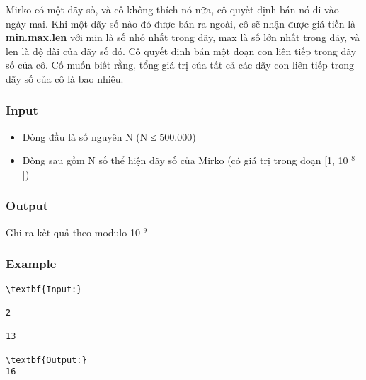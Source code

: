 



   Mirko có một dãy số, và cô không thích nó nữa, cô quyết định bán nó đi vào ngày mai. Khi một dãy số nào đó được bán ra ngoài, cô sẽ nhận được giá tiền là   \textbf{    min.max.len   }   với min là số nhỏ nhất trong dãy, max là số lớn nhất trong dãy, và len là độ dài của dãy số đó. Cô quyết định bán một đoạn con liên tiếp trong dãy số của cô. Cố muốn biết rằng, tổng giá trị của tất cả các dãy con liên tiếp trong dãy số của cô là bao nhiêu.  

\subsubsection{   Input  }
\begin{itemize}
	\item     Dòng đầu là số nguyên N (N ≤ 500.000)   
	\item     Dòng sau gồm N số thể hiện dãy số của Mirko (có giá trị trong đoạn [1, 10    $^     8    $    ])    \textbf{}
\end{itemize}

\subsubsection{   Output  }

   Ghi ra kết quả theo modulo 10   $^    9   $

\subsubsection{   Example  }
\begin{verbatim}
\textbf{Input:}

2

13

\textbf{Output:}
16\end{verbatim}